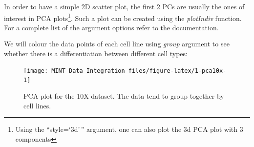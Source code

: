 \documentclass[]{book}
\newenvironment{Shaded}{\begin{snugshade}}{\end{snugshade}}
\newcommand{\CommentTok}[1]{\textcolor[rgb]{0.56,0.35,0.01}{\textit{#1}}}
\newcommand{\DataTypeTok}[1]{\textcolor[rgb]{0.13,0.29,0.53}{#1}}
\newcommand{\DecValTok}[1]{\textcolor[rgb]{0.00,0.00,0.81}{#1}}
\newcommand{\FloatTok}[1]{\textcolor[rgb]{0.00,0.00,0.81}{#1}}
\newcommand{\KeywordTok}[1]{\textcolor[rgb]{0.13,0.29,0.53}{\textbf{#1}}}
\newcommand{\NormalTok}[1]{#1}
\newcommand{\OperatorTok}[1]{\textcolor[rgb]{0.81,0.36,0.00}{\textbf{#1}}}
\newcommand{\OtherTok}[1]{\textcolor[rgb]{0.56,0.35,0.01}{#1}}
\newcommand{\StringTok}[1]{\textcolor[rgb]{0.31,0.60,0.02}{#1}}
\let\rmarkdownfootnote\footnote%
\def\footnote{\protect\rmarkdownfootnote}
\theoremstyle{definition}
\theoremstyle{definition}
\theoremstyle{definition}
\theoremstyle{remark}
\begin{document}
In order to have a simple 2D scatter plot, the first 2 PCs are usually
the ones of interest in PCA plots\footnote{Using the ``style=`3d'\,''
  argument, one can also plot the 3d PCA plot with 3 components}. Such a
plot can be created using the \emph{plotIndiv} function. For a complete
list of the argument options refer to the documentation.

We will colour the data points of each cell line using \emph{group}
argument to see whether there is a differentiation between different
cell types:

\begin{Shaded}
\end{Shaded}

\begin{Shaded}
\end{Shaded}

\begin{figure}[ht]

{\centering \texttt{[image: MINT\_Data\_Integration\_files/figure-latex/1-pca10x-1]} 

}

\caption{PCA plot for the 10X dataset. The data tend to group together by cell lines.}\label{fig:1-pca10x}
\end{figure}
\end{document}

